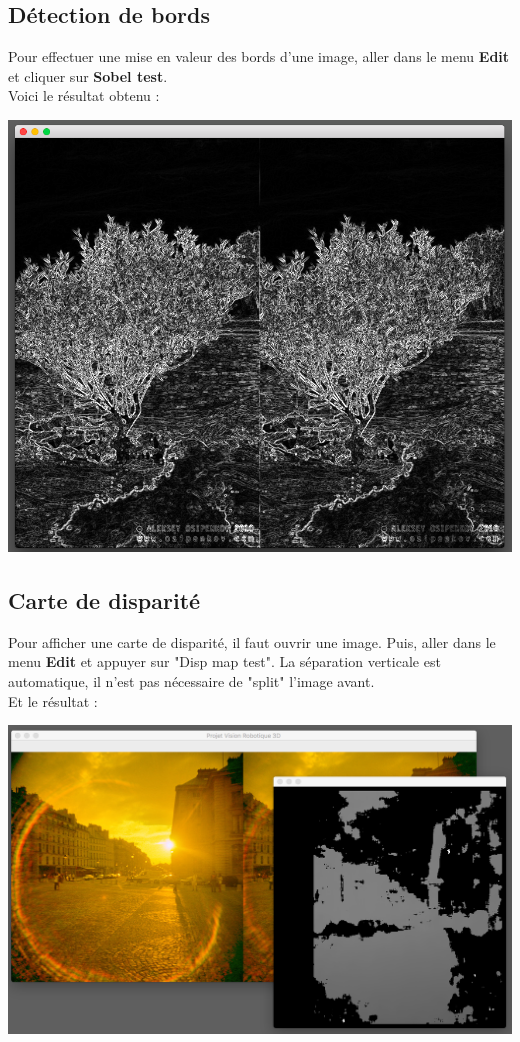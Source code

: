 \documentclass[a4paper]{article}
\begin{document}
\newpage
\subsection*{Détection de bords}

Pour effectuer une mise en valeur des bords d'une image, aller dans le menu
\textbf{Edit} et cliquer sur \textbf{Sobel test}. \\
Voici le résultat obtenu : \\[0.4cm]
\centerline{\includegraphics[width=\textwidth,height=\textheight,keepaspectratio]{img/4.png}}

\newpage
\subsection*{Carte de disparité}

Pour afficher une carte de disparité, il faut ouvrir une image. Puis, aller dans
le menu \textbf{Edit} et appuyer sur "Disp map test". La séparation verticale est
automatique, il n'est pas nécessaire de "split" l'image avant. \\
Et le résultat : \\[0.4cm]
\centerline{\includegraphics[width=\textwidth,height=\textheight,keepaspectratio]{img/5.png}}
\end{document}
